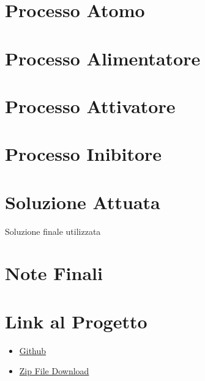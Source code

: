 \documentclass{article}
\begin{document}
\section{Processo Atomo}

\section{Processo Alimentatore}

\section{Processo Attivatore}

\section{Processo Inibitore}


\section{Soluzione Attuata}
Soluzione finale utilizzata

\section{Note Finali}


\section{Link al Progetto}
    \begin{itemize}
        \item \href{https://github.com/filippo-ferrando/progetto-so}{Github}
        \item \href{https://github.com/filippo-ferrando/progetto-so/archive/refs/heads/main.zip}{Zip File Download}
    \end{itemize}
\end{document}

